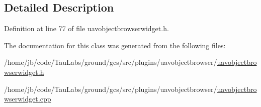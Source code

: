 \subsection{\-Detailed \-Description}


\-Definition at line 77 of file uavobjectbrowserwidget.\-h.



\-The documentation for this class was generated from the following files\-:\begin{DoxyCompactItemize}
\item 
/home/jb/code/\-Tau\-Labs/ground/gcs/src/plugins/uavobjectbrowser/\hyperlink{uavobjectbrowserwidget_8h}{uavobjectbrowserwidget.\-h}\item 
/home/jb/code/\-Tau\-Labs/ground/gcs/src/plugins/uavobjectbrowser/\hyperlink{uavobjectbrowserwidget_8cpp}{uavobjectbrowserwidget.\-cpp}\end{DoxyCompactItemize}
